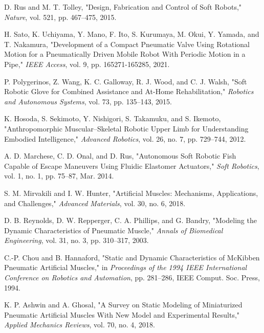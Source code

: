 \documentclass[letterpaper, 10 pt, conference]{IEEEconf}
\begin{document}
\begin{thebibliography}{99}

     D. Rus and M. T. Tolley, "Design, Fabrication and Control of Soft Robots," \textit{Nature}, vol. 521, pp. 467--475, 2015.
    
     H. Sato, K. Uchiyama, Y. Mano, F. Ito, S. Kurumaya, M. Okui, Y. Yamada, and T. Nakamura, "Development of a Compact Pneumatic Valve Using Rotational Motion for a Pneumatically Driven Mobile Robot With Periodic Motion in a Pipe," \textit{IEEE Access}, vol. 9, pp. 165271-165285, 2021.
    
     P. Polygerinos, Z. Wang, K. C. Galloway, R. J. Wood, and C. J. Walsh, "Soft Robotic Glove for Combined Assistance and At-Home Rehabilitation," \textit{Robotics and Autonomous Systems}, vol. 73, pp. 135--143, 2015.
    
     K. Hosoda, S. Sekimoto, Y. Nishigori, S. Takamuku, and S. Ikemoto, "Anthropomorphic Muscular–Skeletal Robotic Upper Limb for Understanding Embodied Intelligence," \textit{Advanced Robotics}, vol. 26, no. 7, pp. 729--744, 2012.
    
     A. D. Marchese, C. D. Onal, and D. Rus, "Autonomous Soft Robotic Fish Capable of Escape Maneuvers Using Fluidic Elastomer Actuators," \textit{Soft Robotics}, vol. 1, no. 1, pp. 75--87, Mar. 2014.
    
     S. M. Mirvakili and I. W. Hunter, "Artificial Muscles: Mechanisms, Applications, and Challenges," \textit{Advanced Materials}, vol. 30, no. 6, 2018.
    
     D. B. Reynolds, D. W. Repperger, C. A. Phillips, and G. Bandry, "Modeling the Dynamic Characteristics of Pneumatic Muscle," \textit{Annals of Biomedical Engineering}, vol. 31, no. 3, pp. 310--317, 2003.
    
     C.-P. Chou and B. Hannaford, "Static and Dynamic Characteristics of McKibben Pneumatic Artificial Muscles," in \textit{Proceedings of the 1994 IEEE International Conference on Robotics and Automation}, pp. 281--286, IEEE Comput. Soc. Press, 1994.
    
     K. P. Ashwin and A. Ghosal, "A Survey on Static Modeling of Miniaturized Pneumatic Artificial Muscles With New Model and Experimental Results," \textit{Applied Mechanics Reviews}, vol. 70, no. 4, 2018.
    

\end{thebibliography}
\end{document}
